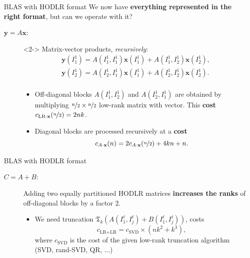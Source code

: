 \documentclass[aspectratio=169,xcolor=dvipsnames]{beamer}
\begin{document}
	\begin{frame}{BLAS with HODLR format}
	\faQuestionCircle\;We now have \textbf{everything represented in the right format}, but can we operate with it?
	
	\begin{description}
		\item[$\mathbf{y} = A\mathbf{x}$:]<2-> Matrix-vector products, \emph{recursively}:
		\[
		\begin{array}{l}
			\mathbf{y}(I^1_1) = A(I_1^1,I_1^1) \mathbf{x}(I_1^1) + A(I^1_1,I_2^1) \mathbf{x}(I_2^1),\\
			\mathbf{y}(I^1_2) = A(I_2^1,I_1^1) \mathbf{x}(I_1^1) + A(I^1_2,I_2^1) \mathbf{x}(I_2^1).\\
		\end{array}
		\]
		\begin{itemize}
			\item[\faCog]<3-> Off-diagonal blocks $A(I_1^1,I_2^1)$ and $A(I_2^1,I_1^1)$ are obtained by multiplying $\nicefrac{n}{2} \times \nicefrac{n}{2}$ low-rank matrix with vector. This \alert{\textbf{cost}} $c_{\text{LR}\cdot\mathbf{x}}(\nicefrac{n}{2}) = 2nk$.
			\item[\faCog]<4-> Diagonal blocks are processed recursively at a \alert{\textbf{cost}}
			\[
			c_{A\cdot \mathbf{x}}(n) = 2 c_{A\cdot \mathbf{x}}(\nicefrac{n}{2}) + 4kn + n.
			\]
		\end{itemize}
	\end{description}
	
	\end{frame}

	\begin{frame}{BLAS with HODLR format}
	\begin{description}
		\item[$C = A + B$:] Adding two equally partitioned HODLR matrices \textbf{increases the ranks} of off-diagonal blocks by a factor $2$.
		\begin{itemize}
			\item[\faCog]<2-> We need truncation $\mathfrak{T}_k( A(I_1^\ell,I_j^\ell) + B(I_1^\ell,I_j^\ell) )$, costs
			\[
			c_{\text{LR}+\text{LR}} = c_{\text{SVD}} \times (n k^2 + k^3),
			\]
		where $c_{\text{SVD}}$ is the cost of the given low-rank truncation algorithm (SVD, rand-SVD, QR, $\ldots$)
		\end{itemize}
	\end{description}
	\end{frame}
\end{document}
